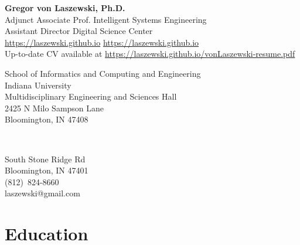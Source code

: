 \documentclass{article}
\begin{document}
\setcounter{varseg}{0}
\newcommand{\pbib}{\stepcounter{varseg} \printbibliography[heading=none,resetnumbers=false,segment=\the\numexpr\value{varseg}]}


\begin{center}
  {\huge\bf Gregor von Laszewski, Ph.D.} \\
Adjunct Associate Prof. Intelligent Systems Engineering\\
Assistant Director Digital Science Center\\
\href{https://laszewski.github.io}{https://laszewski.github.io}
\url{https://laszewski.github.io}\\
Up-to-date CV available at %
\url{https://laszewski.github.io/vonLaszewski-resume.pdf}\\

\end{center}

\begin{minipage}[t]{0.6\columnwidth}

School of Informatics and Computing and Engineering\\
Indiana University\\
Multidisciplinary Engineering and Sciences Hall\\
2425 N Milo Sampson Lane\\
Bloomington, IN  47408\\
\end{minipage}
\ \
\begin{minipage}[t]{0.4\columnwidth}
 South Stone Ridge Rd\\
Bloomington, IN 47401\\
(812)~824-8660\\
laszewski@gmail.com\\
\end{minipage}



\section{Education}
\end{document}
